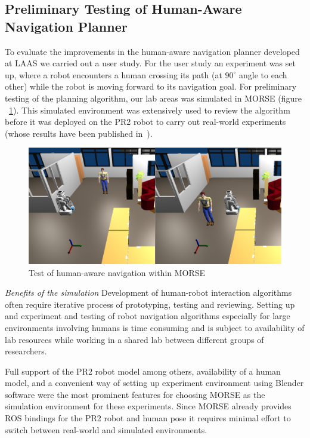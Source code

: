 \documentclass[conference]{IEEEtran}
\begin{document}
\subsection{Preliminary Testing of Human-Aware Navigation Planner}
\label{sc:navigation}

To evaluate the improvements in the human-aware navigation planner developed at
LAAS we carried out a user study. For the user study an experiment was set up,
where a robot encounters a human crossing its path (at $90^{\circ }$ angle to
each other) while the robot is moving forward to its navigation goal. For
preliminary testing of the planning algorithm, our lab areas was simulated in
MORSE (figure ~\ref{fig|hanp}). This simulated environment was extensively used
to review the algorithm before it was deployed on the PR2 robot to carry out
real-world experiments (whose results have been published
in~\cite{ThibaultKruse2014}).

\begin{figure}[H]
      \centering
      \includegraphics[width=\linewidth]{morsehanp.png}
      \caption{Test of human-aware navigation within MORSE}
      \label{fig|hanp}
\end{figure}

\emph{Benefits of the simulation} Development of human-robot interaction
algorithms often require iterative process of prototyping, testing and
reviewing. Setting up and experiment and testing of robot navigation algorithms
especially for large environments involving humans is time consuming and is
subject to availability of lab resources while working in a shared lab between
different groups of researchers. 

Full support of the PR2 robot model among others, availability of a human model,
and a convenient way of setting up experiment environment using Blender software
were the most prominent features for choosing MORSE as the simulation
environment for these experiments. Since MORSE already provides ROS bindings for
the PR2 robot and human pose it requires minimal effort to switch between
real-world and simulated environments.
\end{document}
